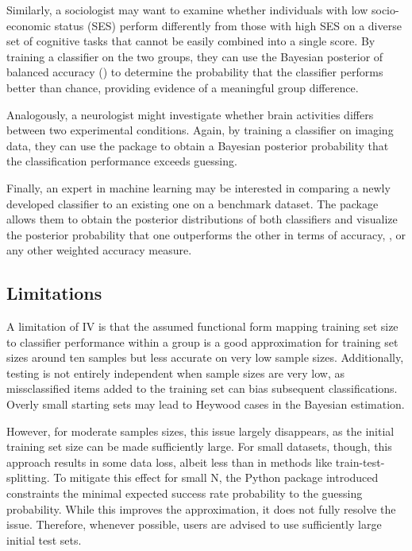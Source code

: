 \documentclass[man]{apa7}
\begin{document}
Similarly, a sociologist may want to examine whether individuals with low socio-economic status (SES) perform differently from those with high SES on a diverse set of cognitive tasks that cannot be easily combined into a single score. By training a classifier on the two groups, they can use the Bayesian posterior of balanced accuracy () to determine the probability that the classifier performs better than chance, providing evidence of a meaningful group difference.

Analogously, a neurologist might investigate whether brain activities differs between two experimental conditions. Again, by training a classifier on imaging data, they can use the package to obtain a Bayesian posterior probability that the classification performance exceeds guessing.

Finally, an expert in machine learning may be interested in comparing a newly developed classifier to an existing one on a benchmark dataset. The package allows them to obtain the posterior distributions of both classifiers and visualize the posterior probability that one outperforms the other in terms of accuracy, , or any other weighted accuracy measure.

\subsection{Limitations} \label{sec:limitations}
A limitation of IV is that the assumed functional form mapping training set size to classifier performance within a group is a good approximation for training set sizes around ten samples but less accurate on very low sample sizes. Additionally, testing is not entirely independent when sample sizes are very low, as missclassified items added to the training set can bias subsequent classifications. Overly small starting sets may lead to Heywood cases in the Bayesian estimation.

However, for moderate samples sizes, this issue largely disappears, as the initial training set size can be made sufficiently large. For small datasets, though, this approach results in some data loss, albeit less than in methods like train-test-splitting. To mitigate this effect for small N, the Python package introduced constraints the minimal expected success rate probability to the guessing probability. While this improves the approximation, it does not fully resolve the issue. Therefore, whenever possible, users are advised to use sufficiently large initial test sets.
\end{document}
